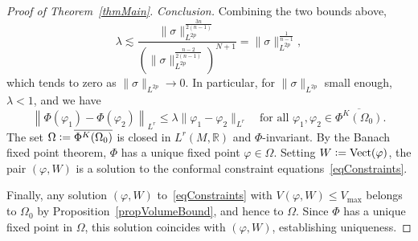 \documentclass[a4paper, 10pt, reqno]{amsart}
\theoremstyle{plain}
\theoremstyle{remark}
\theoremstyle{definition}
\renewcommand{\phi}{\varphi}
\newcommand{\bR}{\mathbb{R}}
\newcommand{\definedas}{\mathrel{\raise.095ex\hbox{\rm :}\mkern-5.2mu=}}
\begin{document}
\begin{proof}[Proof of Theorem~\ref{thmMain}]
	\medskip\noindent\textit{Conclusion.}
	Combining the two bounds above,
	\[
		\lambda \lesssim
		\frac{\|\sigma\|_{L^{2p}}^{\frac{3n}{2(n-1)}}}
		{\left(\|\sigma\|_{L^{2p}}^{\frac{n-2}{2(n-1)}}\right)^{N+1}}
		= \|\sigma\|_{L^{2p}}^{\frac{1}{n-1}},
	\]
	which tends to zero as $\|\sigma\|_{L^{2p}} \to 0$. In particular, for
	$\|\sigma\|_{L^{2p}}$ small enough, $\lambda < 1$, and we have
	\[
		\left\|\Phi(\phi_1) - \Phi(\phi_2)\right\|_{L^r} \leq \lambda \|\phi_1 - \phi_2\|_{L^r}
		\quad\text{for all } \phi_1, \phi_2 \in \overline{\Phi^K(\Omega_0)}.
	\]
	The set $\Omega \definedas \overline{\Phi^K(\Omega_0)}$ is closed in $L^r(M,
		\bR)$ and $\Phi$-invariant. By the Banach fixed point theorem, $\Phi$ has a
	unique fixed point $\phi \in \Omega$. Setting $W \definedas
		\mathrm{Vect}(\phi)$, the pair $(\phi, W)$ is a solution to the conformal
	constraint equations~\eqref{eqConstraints}.

	Finally, any solution $(\phi, W)$ to~\eqref{eqConstraints} with $V(\phi, W)
		\leq V_{\max}$ belongs to $\Omega_0$ by Proposition~\ref{propVolumeBound}, and
	hence to $\Omega$. Since $\Phi$ has a unique fixed point in $\Omega$, this
	solution coincides with $(\phi, W)$, establishing uniqueness.
\end{proof}


%



\end{document}
